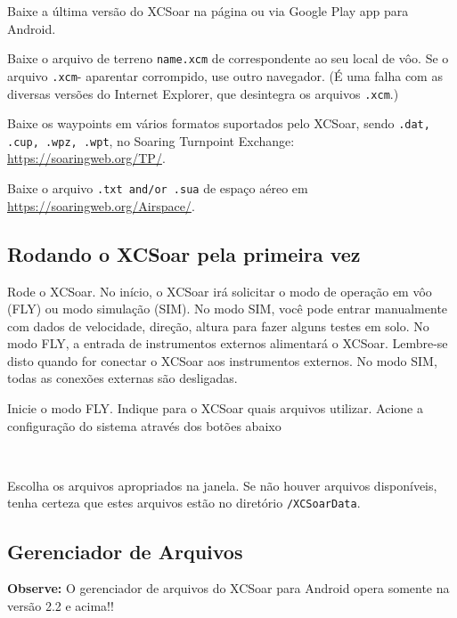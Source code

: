 \documentclass[a4paper,12pt]{refrep}
\renewcommand{\config}[3]{\bmenut{Config}{#1/3}{\LARGE$\triangleright$}~\bmenut{#2}{#3}}%
\begin{document}
\begin{compactitem}
\item[1.] Baixe a última versão do XCSoar na página 
{\xcsoarwebsite{}} ou via Google Play app para Android.
\item[2.] Baixe o arquivo de terreno \texttt{name.xcm} de 
{}
correspondente ao seu local de vôo.  Se o arquivo \texttt{.xcm}- aparentar corrompido, use outro navegador. (É uma falha com as diversas versões do Internet Explorer, que desintegra os arquivos \texttt{.xcm}.)
\item[3.] Baixe os waypoints em vários formatos suportados pelo XCSoar, sendo \texttt{.dat, .cup, .wpz, .wpt}, no Soaring Turnpoint Exchange: {\url{https://soaringweb.org/TP/}}.
\item[4.] Baixe o arquivo \texttt{.txt and/or .sua} de espaço aéreo em {\url{https://soaringweb.org/Airspace/}}.
\end{compactitem}

\subsection{\textcolor{flashblue}{Rodando o XCSoar pela primeira vez}}
Rode o XCSoar.  No início, o XCSoar irá solicitar o modo de operação em vôo (FLY) ou modo simulação (SIM).  No modo SIM, você pode entrar manualmente com dados de velocidade, direção, altura para fazer alguns testes em solo.  No modo FLY, a entrada de instrumentos externos alimentará o XCSoar.  Lembre-se disto quando for conectar o XCSoar aos instrumentos externos.  No modo SIM, todas as conexões externas são desligadas.

Inicie o modo FLY.  Indique para o XCSoar quais arquivos utilizar.  Acione a configuração do sistema através dos botões abaixo

\begin{flushleft}\hspace*{1cm}\config{2}{Sistema}{}\blink{}
\blink{}\\\end{flushleft}

Escolha os arquivos apropriados na janela.  Se não houver arquivos disponíveis, tenha certeza que estes arquivos estão no diretório \texttt{/XCSoarData}.

\subsection{\textcolor{flashblue}{Gerenciador de Arquivos}}
\textbf{Observe:} O gerenciador de arquivos do XCSoar para Android opera somente na versão 2.2 e acima!!
\end{document}
